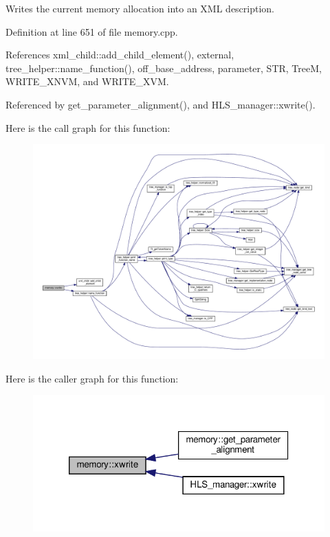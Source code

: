 Writes the current memory allocation into an X\+ML description. 



Definition at line 651 of file memory.\+cpp.



References xml\+\_\+child\+::add\+\_\+child\+\_\+element(), external, tree\+\_\+helper\+::name\+\_\+function(), off\+\_\+base\+\_\+address, parameter, S\+TR, TreeM, W\+R\+I\+T\+E\+\_\+\+X\+N\+VM, and W\+R\+I\+T\+E\+\_\+\+X\+VM.



Referenced by get\+\_\+parameter\+\_\+alignment(), and H\+L\+S\+\_\+manager\+::xwrite().

Here is the call graph for this function\+:
\nopagebreak
\begin{figure}[H]
\begin{center}
\leavevmode
\includegraphics[width=350pt]{d8/d99/classmemory_a078583e5743344036f0620cd532d5e89_cgraph}
\end{center}
\end{figure}
Here is the caller graph for this function\+:
\nopagebreak
\begin{figure}[H]
\begin{center}
\leavevmode
\includegraphics[width=320pt]{d8/d99/classmemory_a078583e5743344036f0620cd532d5e89_icgraph}
\end{center}
\end{figure}


